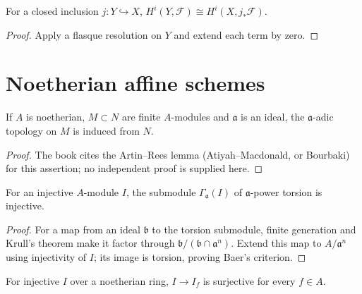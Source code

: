 \begin{lemma}
\label{ha-ch3-lem-closed-extension}
For a closed inclusion $j:Y\hookrightarrow X$,
$H^i(Y,\mathcal F)\cong H^i(X,j_*\mathcal F)$.

\end{lemma}
\begin{proof}
Apply a flasque resolution on $Y$ and extend each term by zero.
\end{proof}

\section{Noetherian affine schemes}
\label{ha-ch3-sec3}
\begin{proposition}
\label{ha-ch3-prop-krull}
If $A$ is noetherian, $M\subset N$ are finite $A$-modules and $\mathfrak a$
is an ideal, the $\mathfrak a$-adic topology on $M$ is induced from $N$.

\end{proposition}
\begin{proof}

The book cites the Artin--Rees lemma (Atiyah--Macdonald, or Bourbaki) for
this assertion; no independent proof is supplied here.

\end{proof}
\begin{lemma}
\label{ha-ch3-lem-torsion-injective}
For an injective $A$-module $I$, the submodule $\Gamma_{\mathfrak a}(I)$ of
$\mathfrak a$-power torsion is injective.

\end{lemma}
\begin{proof}

For a map from an ideal $\mathfrak b$ to the torsion submodule, finite
generation and Krull's theorem make it factor through
$\mathfrak b/(\mathfrak b\cap\mathfrak a^n)$.  Extend this map to $A/\mathfrak a^n$
using injectivity of $I$; its image is torsion, proving Baer's criterion.

\end{proof}
\begin{lemma}
\label{ha-ch3-lem-localize-injective}
For injective $I$ over a noetherian ring, $I\to I_f$ is surjective for every
$f\in A$.

\end{lemma}
